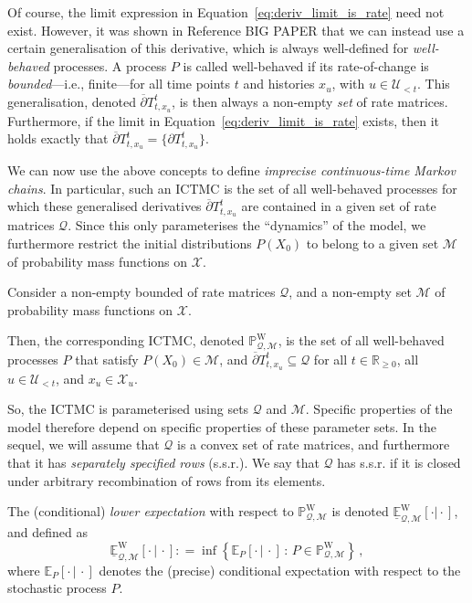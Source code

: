 \documentclass[twoside,11pt]{article}
\newcommand{\reals}{\mathbb{R}}
\newcommand{\realsnonneg}{\reals_{\geq 0}}
\newcommand{\states}{\mathcal{X}}
\newcommand{\processes}{\mathbb{P}}
\newcommand{\wprocesses}{\processes^{\mathrm{W}}}
\newcommand{\lexp}{\underline{\mathbb{E}}_{\rateset,\mathcal{M}}^\mathrm{W}}
\newcommand{\rateset}{\mathcal{Q}}
\newcommand{\coloneqq}{:\!=}
\begin{document}
Of course, the limit expression in Equation~\eqref{eq:deriv_limit_is_rate} need not exist. However, it was shown in Reference BIG PAPER that we can instead use a certain generalisation of this derivative, which is always well-defined for \emph{well-behaved} processes. A process $P$ is called well-behaved if its rate-of-change is \emph{bounded}---i.e., finite---for all time points $t$ and histories $x_u$, with $u\in\mathcal{U}_{<t}$. This generalisation, denoted $\overline{\partial} T_{t,x_u}^t$, is then always a non-empty \emph{set} of rate matrices. Furthermore, if the limit in Equation~\eqref{eq:deriv_limit_is_rate} exists, then it holds exactly that $\overline{\partial} T_{t,x_u}^t=\{\partial T_{t,x_u}^t\}$.

We can now use the above concepts to define \emph{imprecise continuous-time Markov chains}. In particular, such an ICTMC is the set of all well-behaved processes for which these generalised derivatives $\overline{\partial} T_{t,x_u}^t$ are contained in a given set of rate matrices $\rateset$. Since this only parameterises the ``dynamics'' of the model, we furthermore restrict the initial distributions $P(X_0)$ to belong to a given set $\mathcal{M}$ of probability mass functions on $\states$.

\begin{definition}[ICTMC]
Consider a non-empty bounded of rate matrices $\rateset$, and a non-empty set $\mathcal{M}$ of probability mass functions on $\states$.

Then, the corresponding ICTMC, denoted $\wprocesses_{\rateset,\mathcal{M}}$, is the set of all well-behaved processes $P$ that satisfy $P(X_0)\in\mathcal{M}$, and $\overline{\partial} T_{t,x_u}^t \subseteq \rateset$ for all $t\in\realsnonneg$, all $u\in\mathcal{U}_{<t}$, and $x_u\in\states_u$.
\end{definition}
So, the ICTMC is parameterised using sets $\rateset$ and $\mathcal{M}$. Specific properties of the model therefore depend on specific properties of these parameter sets. In the sequel, we will assume that $\rateset$ is a convex set of rate matrices, and furthermore that it has \emph{separately specified rows} (s.s.r.). We say that $\rateset$ has s.s.r. if it is closed under arbitrary recombination of rows from its elements.

The (conditional) \emph{lower expectation} with respect to $\wprocesses_{\rateset,\mathcal{M}}$ is denoted $\lexp[\cdot\vert\cdot]$, and defined as
\begin{equation*}
\lexp[\cdot\,\vert\,\cdot] \coloneqq \inf\left\{\mathbb{E}_P[\cdot\,\vert\,\cdot]\,:\,P\in\wprocesses_{\rateset,\mathcal{M}}\right\}\,,
\end{equation*}
where $\mathbb{E}_P[\cdot\,\vert\,\cdot]$ denotes the (precise) conditional expectation with respect to the stochastic process $P$.
\end{document}
